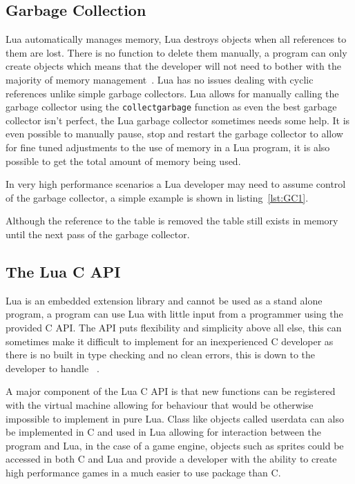 \documentclass[11pt,a4paper,titlepage]{report}
\begin{document}
\subsection{Garbage Collection}

	Lua automatically manages memory, Lua destroys objects when all references to them are lost. There is no function to delete them manually, a program can only create objects which means that the developer will not need to bother with the majority of memory management~\cite{Ierusalimschy:2013:PLT:2502646}. Lua has no issues dealing with cyclic references unlike simple garbage collectors. Lua allows for manually calling the garbage collector using the \texttt{collectgarbage} function as even the best garbage collector isn't perfect, the Lua garbage collector sometimes needs some help. It is even possible to manually pause, stop and restart the garbage collector to allow for fine tuned adjustments to the use of memory in a Lua program, it is also possible to get the total amount of memory being used.

	In very high performance scenarios a Lua developer may need to assume control of the garbage collector, a simple example is shown in listing~\ref{lst:GC1}.
	
	
	Although the reference to the table is removed the table still exists in memory until the next pass of the garbage collector.

\subsection{The Lua C API}

	Lua is an embedded extension library and cannot be used as a stand alone program, a program can use Lua with little input from a programmer using the provided C API. The API puts flexibility and simplicity above all else, this can sometimes make it difficult to implement for an inexperienced C developer as there is no built in type checking and no clean errors, this is down to the developer to handle ~\cite{Ierusalimschy:2013:PLT:2502646}.

	A major component of the Lua C API is that new functions can be registered with the virtual machine allowing for behaviour that would be otherwise impossible to implement in pure Lua. Class like objects called userdata can also be implemented in C and used in Lua allowing for interaction between the program and Lua, in the case of a game engine, objects such as sprites could be accessed in both C and Lua and provide a developer with the ability to create high performance games in a much easier to use package than C.
\end{document}
